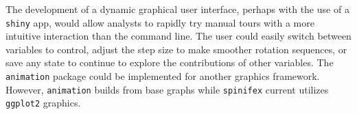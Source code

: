 \documentclass{monashthesis}
\begin{document}
The development of a dynamic graphical user interface, perhaps with the
use of a \texttt{shiny} app, would allow analysts to rapidly try manual
tours with a more intuitive interaction than the command line. The user
could easily switch between variables to control, adjust the step size
to make smoother rotation sequences, or save any state to continue to
explore the contributions of other variables. The \texttt{animation}
package \textcite{xie_animation:_2018} could be implemented for another
graphics framework. However, \texttt{animation} builds from base graphs
while \texttt{spinifex} current utilizes \texttt{ggplot2} graphics.

\printbibliography[heading=bibintoc]
\end{document}
